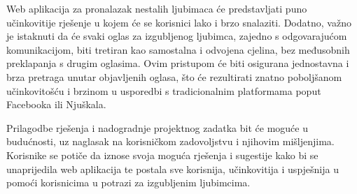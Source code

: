 		Web aplikacija za pronalazak nestalih ljubimaca će predstavljati puno učinkovitije rješenje u kojem će se korisnici lako i brzo snalaziti. Dodatno, važno je istaknuti da će svaki oglas za izgubljenog ljubimca, zajedno s odgovarajućom komunikacijom, biti tretiran kao samostalna i odvojena cjelina, bez međusobnih preklapanja s drugim oglasima. Ovim pristupom će biti osigurana jednostavna i brza pretraga unutar objavljenih oglasa, što će rezultirati znatno poboljšanom učinkovitošću i brzinom u usporedbi s tradicionalnim platformama poput Facebooka ili Njuškala.
		
		Prilagodbe rješenja i nadogradnje projektnog zadatka bit će moguće u budućnosti, uz naglasak na korisničkom zadovoljstvu i njihovim mišljenjima. Korisnike se potiče da iznose svoja moguća rješenja i sugestije kako bi se unaprijedila web aplikacija te postala sve korisnija, učinkovitija i uspješnija u pomoći korisnicima u potrazi za izgubljenim ljubimcima.
		
		\eject
		
		
	